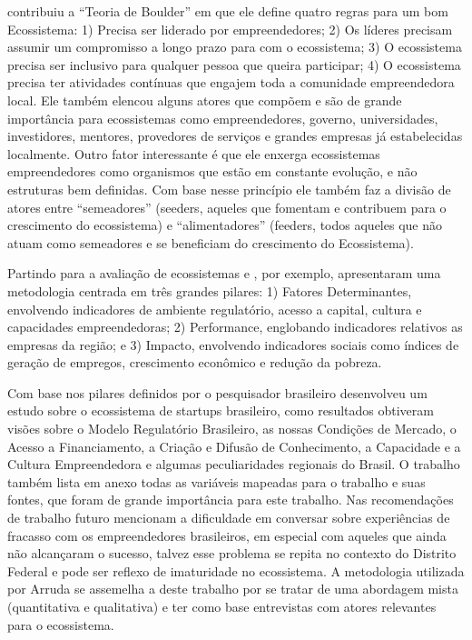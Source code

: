  contribuiu a ``Teoria de Boulder'' em que ele define quatro regras para um bom Ecossistema: 1) Precisa ser liderado por empreendedores; 2) Os líderes precisam assumir um compromisso a longo prazo para com o ecossistema; 3) O ecossistema precisa ser inclusivo para qualquer pessoa que queira participar; 4) O ecossistema precisa ter atividades contínuas que engajem toda a comunidade empreendedora local. Ele também elencou alguns atores que compõem e são de grande importância para ecossistemas como empreendedores, governo, universidades, investidores, mentores, provedores de serviços e grandes empresas já estabelecidas localmente. Outro fator interessante é que ele enxerga ecossistemas empreendedores como organismos que estão em constante evolução, e não estruturas bem definidas. Com base nesse princípio ele também faz a divisão de atores entre ``semeadores'' (seeders, aqueles que fomentam e contribuem para o crescimento do ecossistema) e ``alimentadores'' (feeders, todos aqueles que não atuam como semeadores e se beneficiam do crescimento do Ecossistema).  

Partindo para a avaliação de ecossistemas  e , por exemplo, apresentaram uma metodologia centrada em três grandes pilares: 1) Fatores Determinantes, envolvendo indicadores de ambiente regulatório, acesso a capital, cultura e capacidades empreendedoras; 2) Performance, englobando indicadores relativos as empresas da região; e 3) Impacto, envolvendo indicadores sociais como índices de geração de empregos, crescimento econômico e redução da pobreza.

Com base nos pilares definidos por  o pesquisador brasileiro  desenvolveu um estudo sobre o ecossistema de startups brasileiro, como resultados obtiveram visões sobre o Modelo Regulatório Brasileiro, as nossas Condições de Mercado, o Acesso a Financiamento, a Criação e Difusão de Conhecimento, a Capacidade e a Cultura Empreendedora e algumas peculiaridades regionais do Brasil. O trabalho também lista em anexo todas as variáveis mapeadas para o trabalho e suas fontes, que foram de grande importância para este trabalho. Nas recomendações de trabalho futuro mencionam a dificuldade em conversar sobre experiências de fracasso com os empreendedores brasileiros, em especial com aqueles que ainda não alcançaram o sucesso, talvez esse problema se repita no contexto do Distrito Federal e pode ser reflexo de imaturidade no ecossistema. A metodologia utilizada por Arruda se assemelha a deste trabalho por se tratar de uma abordagem mista (quantitativa e qualitativa) e ter como base entrevistas com atores relevantes para o ecossistema.

